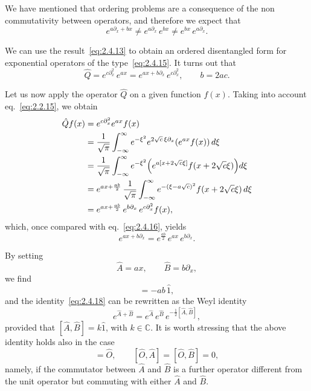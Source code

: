 We have mentioned that ordering problems are a consequence of the non commutativity between operators, and therefore we expect that
\begin{equation}
e^{a\partial_{x}+b x}\neq e^{a\partial_{x}}\,e^{b x}
\neq e^{b x}\,e^{a\partial_{x}}.
\label{eq:2.4.15}
\end{equation}

We can use the result~\eqref{eq:2.4.13} to obtain an ordered disentangled form for exponential operators of the type~\eqref{eq:2.4.15}. It turns out that
\begin{equation}
\hat{Q}=e^{c\partial_{x}^{2}}\,e^{a x}
=e^{a x+b\partial_{x}}\,e^{c\partial_{x}^{2}},\qquad b=2ac.
\label{eq:2.4.16}
\end{equation}

Let us now apply the operator $\hat{Q}$ on a given function $f(x)$. Taking into account eq.~\eqref{eq:2.2.15}, we obtain
\begin{align}
\hat{Q}f(x)&=e^{c\partial_{x}^{2}}e^{a x}f(x)\notag\\
&=\frac{1}{\sqrt{\pi}}\int_{-\infty}^{\infty}e^{-\xi^{2}}
e^{2\sqrt{c}\,\xi\partial_{x}}\!\left(e^{a x}f(x)\right)d\xi\notag\\
&=\frac{1}{\sqrt{\pi}}\int_{-\infty}^{\infty}e^{-\xi^{2}}
\Bigl(e^{a[x+2\sqrt{c}\xi]}f(x+2\sqrt{c}\xi)\Bigr)d\xi\notag\\
&=e^{a x+\frac{a b}{2}}\,
\frac{1}{\sqrt{\pi}}\int_{-\infty}^{\infty}e^{-(\xi-a\sqrt{c})^{2}}
f(x+2\sqrt{c}\xi)\,d\xi\notag\\
&=e^{a x+\frac{a b}{2}}\,e^{b\partial_{x}}\,e^{c\partial_{x}^{2}}f(x),
\label{eq:2.4.17}
\end{align}
which, once compared with eq.~\eqref{eq:2.4.16}, yields
\begin{equation}
e^{a x+b\partial_{x}}=e^{\frac{a b}{2}}\,e^{a x}\,e^{b\partial_{x}}.
\label{eq:2.4.18}
\end{equation}

By setting
\begin{equation}
\hat{A}=a x,\qquad \hat{B}=b\partial_{x},
\label{eq:2.4.19}
\end{equation}
we find
\begin{equation}
[\hat{A},\hat{B}]=-ab\,\hat{1},
\label{eq:2.4.20}
\end{equation}
and the identity~\eqref{eq:2.4.18} can be rewritten as the Weyl identity
\begin{equation}
e^{\hat{A}+\hat{B}}=e^{\hat{A}}\,e^{\hat{B}}\,e^{-\frac{1}{2}[\hat{A},\hat{B}]},
\label{eq:2.4.21}
\end{equation}
provided that $[\hat{A},\hat{B}]=k\hat{1}$, with $k\in\mathbb{C}$. It is worth stressing that the above identity holds also in the case
\begin{equation}
[\hat{A},\hat{B}]=\hat{O},\qquad
[\hat{O},\hat{A}]=[\hat{O},\hat{B}]=0,
\label{eq:2.4.22}
\end{equation}
namely, if the commutator between $\hat{A}$ and $\hat{B}$ is a further operator different from the unit operator but commuting with either $\hat{A}$ and $\hat{B}$.

